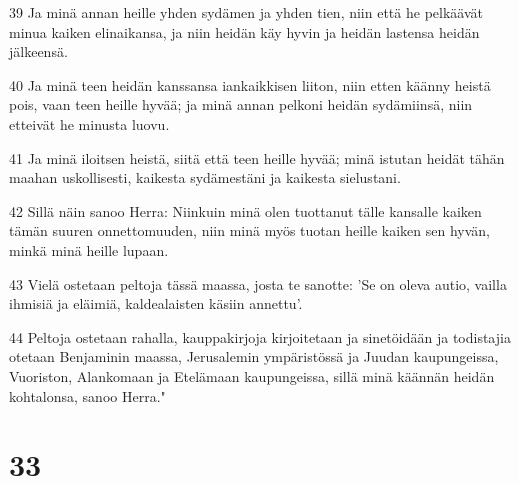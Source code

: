 \par 39 Ja minä annan heille yhden sydämen ja yhden tien, niin että he pelkäävät minua kaiken elinaikansa, ja niin heidän käy hyvin ja heidän lastensa heidän jälkeensä.
\par 40 Ja minä teen heidän kanssansa iankaikkisen liiton, niin etten käänny heistä pois, vaan teen heille hyvää; ja minä annan pelkoni heidän sydämiinsä, niin etteivät he minusta luovu.
\par 41 Ja minä iloitsen heistä, siitä että teen heille hyvää; minä istutan heidät tähän maahan uskollisesti, kaikesta sydämestäni ja kaikesta sielustani.
\par 42 Sillä näin sanoo Herra: Niinkuin minä olen tuottanut tälle kansalle kaiken tämän suuren onnettomuuden, niin minä myös tuotan heille kaiken sen hyvän, minkä minä heille lupaan.
\par 43 Vielä ostetaan peltoja tässä maassa, josta te sanotte: 'Se on oleva autio, vailla ihmisiä ja eläimiä, kaldealaisten käsiin annettu'.
\par 44 Peltoja ostetaan rahalla, kauppakirjoja kirjoitetaan ja sinetöidään ja todistajia otetaan Benjaminin maassa, Jerusalemin ympäristössä ja Juudan kaupungeissa, Vuoriston, Alankomaan ja Etelämaan kaupungeissa, sillä minä käännän heidän kohtalonsa, sanoo Herra."

\chapter{33}

